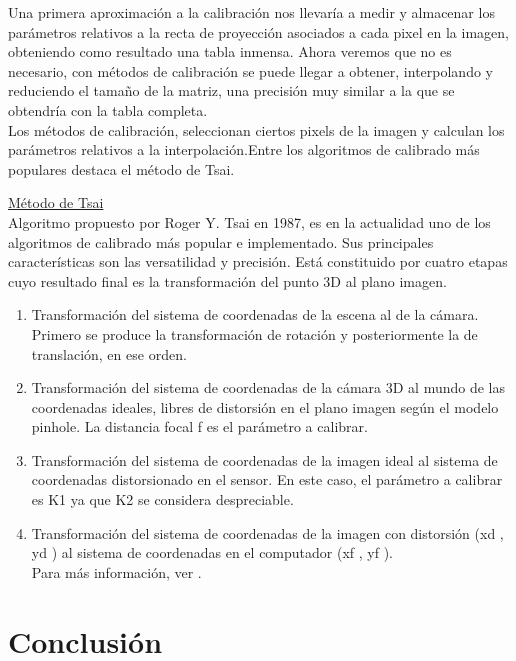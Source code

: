 \documentclass[a4,10pt]{article}
\begin{document}
\begin{enumerate}
\begin {itemize}
\end {itemize}
Una primera aproximación a la calibración nos llevaría a medir y almacenar los parámetros relativos a la recta de proyección asociados a cada pixel en la imagen, obteniendo como resultado una tabla inmensa. Ahora veremos que no es necesario, con métodos de calibración se puede llegar a obtener, interpolando y reduciendo el tamaño de la matriz, una precisión muy similar a la que se obtendría con la tabla completa.\\
Los métodos de calibración, seleccionan ciertos pixels de la imagen y calculan los parámetros relativos a la interpolación.Entre los algoritmos de calibrado más populares destaca el método de Tsai.

\underline{Método de Tsai}\\
Algoritmo propuesto por Roger Y. Tsai en 1987, es en la actualidad uno de los algoritmos de calibrado más popular e implementado. Sus principales características son las versatilidad y precisión. Está constituido por cuatro etapas cuyo resultado final es la transformación del punto 3D al plano imagen.
\begin{enumerate}
\item Transformación del sistema de coordenadas de la escena al de la cámara. Primero se produce la transformación de rotación y posteriormente la de translación, en ese orden.
\item Transformación del sistema de coordenadas de la cámara 3D al mundo de las coordenadas ideales, libres de distorsión en el plano imagen según el modelo pinhole. La distancia focal f es el parámetro a calibrar.
\item Transformación del sistema de coordenadas de la imagen ideal al sistema de coordenadas distorsionado en el sensor. En este caso, el parámetro a calibrar es K1 ya que K2 se considera despreciable.
\item Transformación del sistema de coordenadas de la imagen con distorsión (xd , yd ) al sistema de coordenadas en el computador (xf , yf ).\\
Para más información, ver \cite{tsai}. 
\end{enumerate}
\end {enumerate}


\section{Conclusión}
\end{document}
